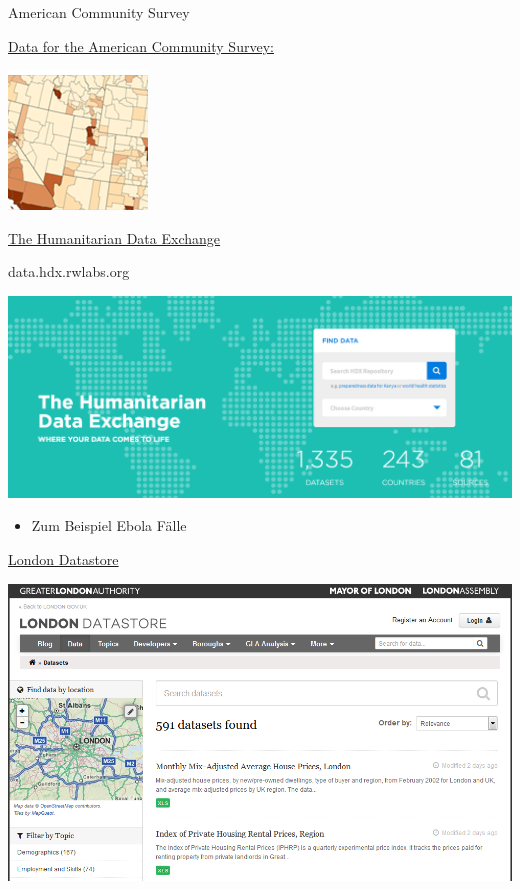 \documentclass[ignorenonframetext,]{beamer}
\providecommand{\tightlist}{%
  \setlength{\itemsep}{0pt}\setlength{\parskip}{0pt}}
\begin{document}
\begin{frame}{American Community Survey}

\begin{block}{\href{http://www.census.gov/acs/www/}{Data for the
American Community Survey:}}

\includegraphics{figure/american_comsurvey.png}

\end{block}

\end{frame}

\begin{frame}{\href{https://data.hdx.rwlabs.org/dataset/rowca-ebola-cases}{The
Humanitarian Data Exchange}}

data.hdx.rwlabs.org

\includegraphics{figure/HDx.PNG}

\begin{itemize}
\tightlist
\item
  Zum Beispiel Ebola Fälle
\end{itemize}

\end{frame}

\begin{frame}{\href{http://data.london.gov.uk/dataset}{London
Datastore}}

\includegraphics{figure/LondonData.PNG}

\end{frame}
\end{document}
